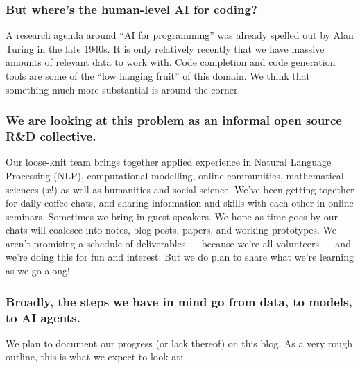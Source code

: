 \documentclass[11pt]{article}
\begin{document}
\subsubsection{But where’s the human-level AI for coding?}
\label{sec:org3fd9cf6}

A research agenda around “AI for programming” was already spelled out
by Alan Turing in the late 1940s.  It is only relatively recently that
we have massive amounts of relevant data to work with.  Code
completion and code generation tools are some of the “low hanging
fruit” of this domain.  We think that something much more substantial
is around the corner.

\subsubsection{We are looking at this problem as an informal open source R\&D collective.}
\label{sec:org38d4faf}

Our loose-knit team brings together applied experience in Natural Language
Processing (NLP), computational modelling, online communities,
mathematical sciences (\(x!\)) as well as humanities and social science.  We’ve been getting
together for daily coffee chats, and sharing information and skills
with each other in online seminars.  Sometimes we bring in guest
speakers.  We hope as time goes by our chats will coalesce into notes,
blog posts, papers, and working prototypes.  We aren’t promising a
schedule of deliverables — because we’re all volunteers — and we’re
doing this for fun and interest.  But we do plan to share what we’re
learning as we go along!

\subsubsection{Broadly, the steps we have in mind go from data, to models, to AI agents.}
\label{sec:org459165a}

We plan to document our progress (or lack thereof) on this blog.  As a
very rough outline, this is what we expect to look at:
\end{document}
